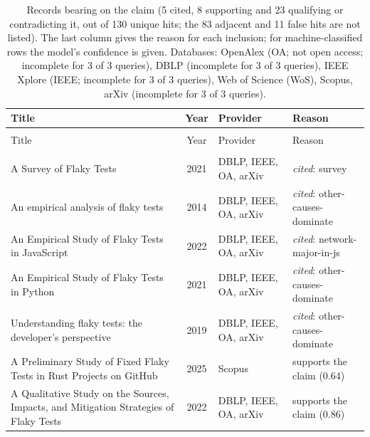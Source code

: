 
\begingroup\footnotesize
\begin{longtable}{@{}%
  >{\raggedright\arraybackslash}p{}c%
  >{\raggedright\arraybackslash}p{}%
  >{\raggedright\arraybackslash}p{}@{}}
\caption{Records bearing on the claim (5 cited, 8 supporting and 23 qualifying or contradicting it, out of 130 unique hits; the 83 adjacent and 11 false hits are not listed). The last column gives the reason for each inclusion; for machine-classified rows the model's confidence is given. Databases: OpenAlex (OA; not open access; incomplete for 3 of 3 queries), DBLP (incomplete for 3 of 3 queries), IEEE Xplore (IEEE; incomplete for 3 of 3 queries), Web of Science (WoS), Scopus, arXiv (incomplete for 3 of 3 queries).}\label{tab:t-flaky}\\
\toprule
Title & Year & Provider & Reason \\
\midrule
\endfirsthead
\multicolumn{4}{@{}l}{\emph{\tablename~\thetable{} (cont.)}}\\
\toprule
Title & Year & Provider & Reason \\
\midrule
\endhead
\midrule \multicolumn{4}{r@{}}{\emph{continued on next page}}\\
\endfoot
\bottomrule
\endlastfoot
A Survey of Flaky Tests & 2021 & DBLP, IEEE, OA, arXiv & \emph{cited}: survey \\
An empirical analysis of flaky tests & 2014 & DBLP, IEEE, OA, arXiv & \emph{cited}: other-causes-dominate \\
An Empirical Study of Flaky Tests in JavaScript & 2022 & DBLP, IEEE, OA, arXiv & \emph{cited}: network-major-in-js \\
An Empirical Study of Flaky Tests in Python & 2021 & DBLP, IEEE, OA, arXiv & \emph{cited}: other-causes-dominate \\
Understanding flaky tests: the developer's perspective & 2019 & DBLP, IEEE, OA, arXiv & \emph{cited}: other-causes-dominate \\
A Preliminary Study of Fixed Flaky Tests in Rust Projects on GitHub & 2025 & Scopus & supports the claim (0.64) \\
A Qualitative Study on the Sources, Impacts, and Mitigation Strategies of Flaky Tests & 2022 & DBLP, IEEE, OA, arXiv & supports the claim (0.86) \\

\end{longtable}
